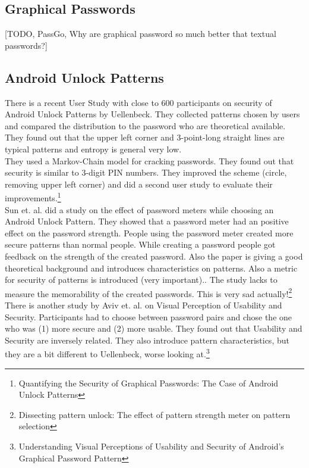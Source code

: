 \documentclass[twocolumn, a4paper, 10pt]{article}
\begin{document}
\subsection{Graphical Passwords}
[TODO, PassGo, Why are graphical password so much better that textual passwords?]

\subsection{Android Unlock Patterns}
There is a recent User Study with close to 600 participants on security of Android Unlock Patterns by Uellenbeck. They collected patterns chosen by users and compared the distribution to the password who are theoretical available. They found out that the upper left corner and 3-point-long straight lines are typical patterns and entropy is general very low.\\

They used a Markov-Chain model for cracking passwords. They found out that security is similar to 3-digit PIN numbers. They improved the scheme (circle, removing upper left corner) and did a second user study to evaluate their improvements.\footnote{Quantifying the Security of Graphical Passwords: The Case of Android Unlock Patterns }\\

Sun et. al. did a study on the effect of password meters while choosing an Android Unlock Pattern. They showed that a password meter had an positive effect on the password strength. People using the password meter created more secure patterns than normal people. While creating a password people got feedback on the strength of the created password. Also the paper is giving a good theoretical background and introduces characteristics on patterns. Also a metric for security of patterns is introduced (very important).. The study lacks to measure the memorability of the created passwords. This is very sad actually!\footnote{Dissecting pattern unlock: The effect of pattern strength meter on pattern selection}\\

There is another study by Aviv et. al. on Visual Perception of Usability and Security. Participants had to choose between password pairs and chose the one who was (1) more secure and (2) more usable. They found out that Usability and Security are inversely related. They also introduce pattern characteristics, but they are a bit different to Uellenbeck, worse looking at.\footnote{Understanding Visual Perceptions of Usability and Security of Android's Graphical Password Pattern}\\
\end{document}

